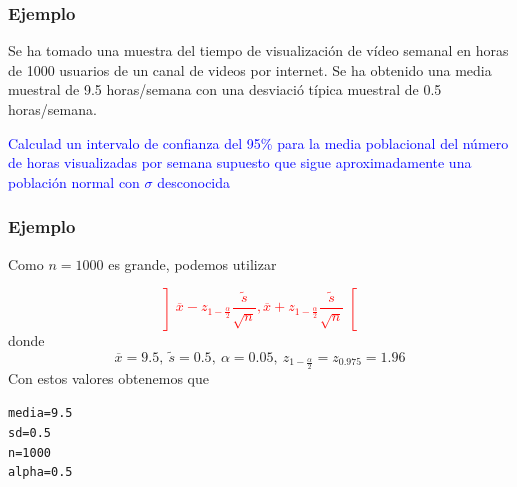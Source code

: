 \documentclass[12pt,t]{beamer}\usepackage[]{graphicx}\usepackage[]{color}
\makeatletter
\newcommand{\hlnum}[1]{\textcolor[rgb]{0.686,0.059,0.569}{#1}}%
\newcommand{\hlstd}[1]{\textcolor[rgb]{0.345,0.345,0.345}{#1}}%
\newcommand{\hlkwb}[1]{\textcolor[rgb]{0.69,0.353,0.396}{#1}}%
\newenvironment{kframe}{%
 \def\at@end@of@kframe{}%
 \ifinner\ifhmode%
  \def\at@end@of@kframe{\end{minipage}}%
  \begin{minipage}{\columnwidth}%
 \fi\fi%
 \def\FrameCommand##1{\hskip\@totalleftmargin \hskip-\fboxsep
 \colorbox{shadecolor}{##1}\hskip-\fboxsep
     \hskip-\linewidth \hskip-\@totalleftmargin \hskip\columnwidth}%
 \MakeFramed {\advance\hsize-\width
   \@totalleftmargin\z@ \linewidth\hsize
   \@setminipage}}%
 {\par\unskip\endMakeFramed%
 \at@end@of@kframe}
\newenvironment{knitrout}{}{} %
\newcommand{\red}[1]{\textcolor{red}{#1}}
\newcommand{\blue}[1]{\textcolor{blue}{#1}}
\theoremstyle{plain}
\theoremstyle{definition}
\makeatother
\begin{document}
\begin{frame}
\frametitle{Ejemplo}
\vspace*{-2ex}

Se ha tomado una muestra del tiempo de visualización de vídeo semanal en horas de  1000  usuarios de un canal de videos por internet. Se ha obtenido  una media   muestral de 9.5 horas/semana con una desviació típica muestral de 0.5 horas/semana. 
\medskip

\blue{Calculad un intervalo de confianza  del 95\% para la media poblacional del número de horas visualizadas por semana supuesto que sigue aproximadamente una población normal con  $\sigma$ desconocida}

\end{frame}


\begin{frame}[fragile]
\frametitle{Ejemplo}
\vspace*{-2ex}

Como $n=1000$ es grande, podemos utilizar

\red{$$
\left]\overline{x}-z_{1-\frac{\alpha}{2}}\frac{\widetilde{s}}{\sqrt{n}},
    \overline{x}+z_{1-\frac{\alpha}{2}}\frac{\widetilde{s}}{\sqrt{n}}\right[
$$}
donde
$$
\overline{x}=9.5,\ \widetilde{s}=0.5,\
\alpha=0.05,\  z_{1-\frac{\alpha}{2}}=z_{0.975}=1.96
$$
Con estos valores obtenemos que 

\begin{knitrout}\small
{}\color{fgcolor}\begin{kframe}
\begin{alltt}
\hlstd{media}\hlkwb{=}\hlnum{9.5}
\hlstd{sd}\hlkwb{=}\hlnum{0.5}
\hlstd{n}\hlkwb{=}\hlnum{1000}
\hlstd{alpha}\hlkwb{=}\hlnum{0.5}
\end{alltt}
\end{kframe}
\end{knitrout}
\end{frame}
\end{document}
